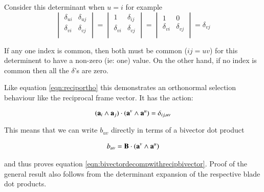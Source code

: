 \documentclass{article}      %
\begin{document}
Consider this determinant when $u=i$ for example
\[
\begin{vmatrix}
\delta_{ui} & \delta_{uj} \\
\delta_{vi} & \delta_{vj} \\
\end{vmatrix} 
=
\begin{vmatrix}
1 & \delta_{ij} \\
\delta_{vi} & \delta_{vj} \\
\end{vmatrix}
=
\begin{vmatrix}
1 & 0 \\
\delta_{vi} & \delta_{vj} \\
\end{vmatrix}
= \delta_{vj}
\]

If any one index is common, then both must be common ($ij=uv$) for this determinent to have a non-zero (ie: one) value.  On the other hand, if no index is common then all the $\delta$'s are zero.

Like 
equation \ref{eqn:reciportho}
this demonstrates an orthonormal selection behaviour like the reciprocal frame vector.  It has the action:

\begin{equation}
(\mathbf{a}_i \wedge \mathbf{a}_j) \cdot (\mathbf{a}^v \wedge \mathbf{a}^u) = \delta_{ij,uv}
\end{equation}

This means that we can write $b_{uv}$ directly in terms of a bivector dot product

\begin{align*}
b_{uv} = \mathbf{B} \cdot (\mathbf{a}^v \wedge \mathbf{a}^u)
\end{align*}

and thus proves equation \ref{eqn:bivectordecompwithrecipbivector}.  Proof of the general result
also follows from the determinant expansion of the respective blade dot products.
\end{document}
